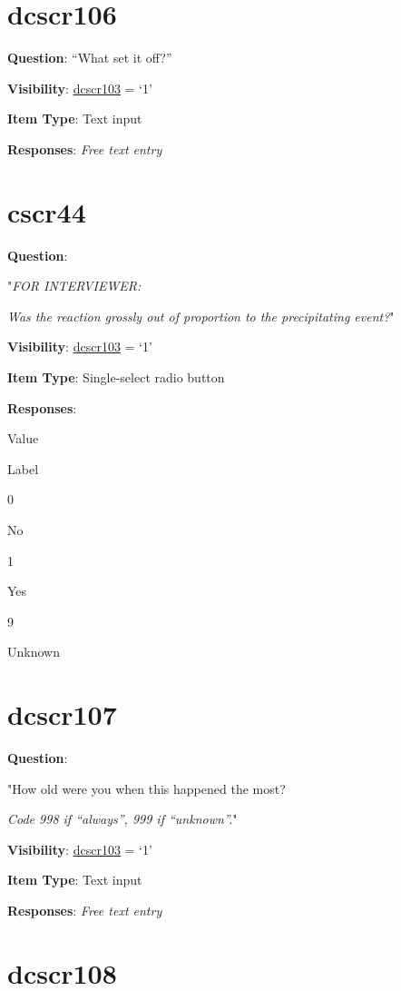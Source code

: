 \documentclass[]{book}
\begin{document}
\hypertarget{dcscr106}{%
\section{dcscr106}\label{dcscr106}}

\textbf{Question}: ``What set it off?''

\textbf{Visibility}: \protect\hyperlink{dcscr103}{dcscr103} = `1'

\textbf{Item Type}: Text input

\textbf{Responses}: \emph{Free text entry}

\hypertarget{cscr44}{%
\section{cscr44}\label{cscr44}}

\textbf{Question}:

"\emph{FOR INTERVIEWER:}

\emph{Was the reaction grossly out of proportion to the precipitating event?}"

\textbf{Visibility}: \protect\hyperlink{dcscr103}{dcscr103} = `1'

\textbf{Item Type}: Single-select radio button

\textbf{Responses}:

Value

Label

0

No

1

Yes

9

Unknown

\hypertarget{dcscr107}{%
\section{dcscr107}\label{dcscr107}}

\textbf{Question}:

"How old were you when this happened the most?

\emph{Code 998 if ``always'', 999 if ``unknown''.}"

\textbf{Visibility}: \protect\hyperlink{dcscr103}{dcscr103} = `1'

\textbf{Item Type}: Text input

\textbf{Responses}: \emph{Free text entry}

\hypertarget{dcscr108}{%
\section{dcscr108}\label{dcscr108}}
\end{document}
